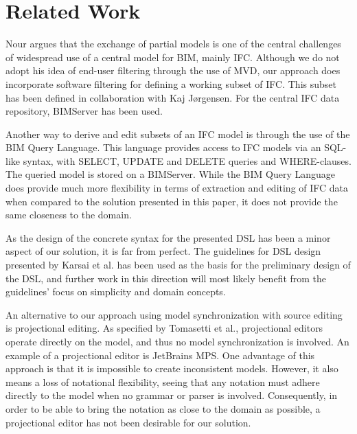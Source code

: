 \section{Related Work}
Nour argues that the exchange of partial models is one of the central challenges of widespread use of a central model for BIM, mainly IFC\cite{nour08}. Although we do not adopt his idea of end-user filtering through the use of MVD, our approach does incorporate software filtering for defining a working subset of IFC. This subset has been defined in collaboration with Kaj J\o rgensen. For the central IFC data repository, BIMServer has been used\cite{beetz10}.

Another way to derive and edit subsets of an IFC model is through the use of the BIM Query Language\cite{mazairac10}. This language provides access to IFC models via an SQL-like syntax, with SELECT, UPDATE and DELETE queries and WHERE-clauses. The queried model is stored on a BIMServer. While the BIM Query Language does provide much more flexibility in terms of extraction and editing of IFC data when compared to the solution presented in this paper, it does not provide the same closeness to the domain.

As the design of the concrete syntax for the presented DSL has been a minor aspect of our solution, it is far from perfect. The guidelines for DSL design presented by Karsai et al. \cite{karsai09} has been used as the basis for the preliminary design of the DSL, and further work in this direction will most likely benefit from the guidelines' focus on simplicity and domain concepts.

\cite{staworko10}


An alternative to our approach using model synchronization with source editing is projectional editing. As specified by Tomasetti et al.\cite{tomasetti11}, projectional editors operate directly on the model, and thus no model synchronization is involved. An example of a projectional editor is JetBrains MPS. One advantage of this approach is that it is impossible to create inconsistent models. However, it also means a loss of notational flexibility, seeing that any notation must adhere directly to the model when no grammar or parser is involved\cite{conf/models/Voelter10}. Consequently, in order to be able to bring the notation as close to the domain as possible, a projectional editor has not been desirable for our solution.

